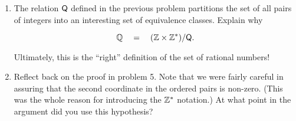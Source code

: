 \begin{enumerate}
\wbvfill

\workbookpagebreak

\item The relation $\mbox{\textsf Q}$ defined in the previous problem partitions
the set of all pairs of integers into an interesting set of equivalence
classes.  Explain why 

\[ {\mathbb Q} \quad = \quad ({\mathbb Z} \times {\mathbb Z}^{\ast}) / \mbox{\textsf Q}. \]

\noindent Ultimately, this is the ``right'' definition of the set 
of rational numbers!

\wbvfill


\item Reflect back on the proof in problem 5.  Note that we were fairly
careful in assuring that the second coordinate in the ordered pairs is
non-zero. (This was the whole reason for introducing the 
${\mathbb Z}^{\ast}$ notation.)  At what point in the argument did you
use this hypothesis?

\wbvfill

\workbookpagebreak

\end{enumerate} 

